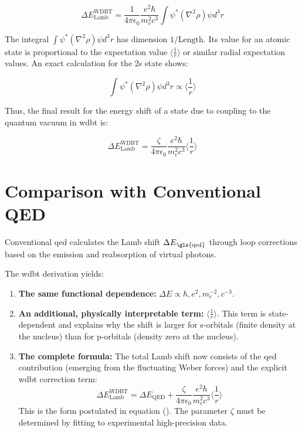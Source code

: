 \begin{equation}
    \Delta E_{\text{Lamb}}^{\text{WDBT}} = \frac{1}{4\pi\epsilon_0} \frac{e^2 \hbar}{m_e^2 c^3} \int \psi^* (\nabla^2 \rho) \psi  d^3r
\end{equation}

The integral $\int \psi^* (\nabla^2 \rho) \psi  d^3r$ has dimension $1/\text{Length}$. Its value for an atomic state is proportional to the expectation value $\langle \frac{1}{r} \rangle$ or similar radial expectation values. An exact calculation for the 2s state shows:

\begin{equation}
    \int \psi^* (\nabla^2 \rho) \psi  d^3r \propto \langle \frac{1}{r} \rangle
\end{equation}

Thus, the final result for the energy shift of a state due to coupling to the quantum vacuum in \gls{wdbt} is:

\begin{equation}
    \boxed
    {
        \Delta E_{\text{Lamb}}^{\text{WDBT}} = \frac{\zeta}{4\pi\epsilon_0} \frac{e^2 \hbar}{m_e^2 c^3} \langle \frac{1}{r} \rangle
    }
\end{equation}

\section{Comparison with Conventional QED}
Conventional \gls{qed} calculates the Lamb shift ${\Delta E}_\text{\gls{qed}}$ through loop corrections based on the emission and reabsorption of virtual photons.

The \gls{wdbt} derivation yields:

\begin{enumerate}
    \item \textbf{The same functional dependence:} $\Delta E \propto \hbar, e^2, m_e^{-2}, c^{-3}$.
    \item \textbf{An additional, physically interpretable term:} $\langle \frac{1}{r} \rangle$. This term is state-dependent and explains why the shift is larger for s-orbitals (finite density at the nucleus) than for p-orbitals (density zero at the nucleus).
    \item \textbf{The complete formula:} The total Lamb shift now consists of the \gls{qed} contribution (emerging from the fluctuating Weber forces) and the explicit \gls{wdbt} correction term:
    \begin{equation}
        \Delta E_{\text{Lamb}}^{\text{WDBT}} = \Delta E_{\text{QED}} + \frac{\zeta}{4\pi\epsilon_0} \frac{e^2 \hbar}{m_e^2 c^3} \langle \frac{1}{r} \rangle
    \end{equation}
    This is the form postulated in equation (). The parameter $\zeta$ must be determined by fitting to experimental high-precision data.
\end{enumerate}

